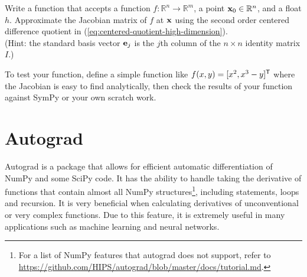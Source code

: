\begin{problem}
Write a function that accepts a function $f:\mathbb{R}^n\rightarrow\mathbb{R}^m$, a point $\mathbf{x}_0 \in \mathbb{R}^n$, and a float $h$.
Approximate the Jacobian matrix of $f$ at $\mathbf{x}$ using the second order centered difference quotient in (\ref{eq:centered-quotient-high-dimension}).
\\(Hint: the standard basis vector $\mathbf{e}_j$ is the $j$th column of the $n\times n$ identity matrix $I$.)

To test your function, define a simple function like $f(x,y) = [x^2, x^3 - y]^{\mathsf T}$ where the Jacobian is easy to find analytically, then check the results of your function against SymPy or your own scratch work.
\label{prob:jac_center}
\end{problem}

\section*{Autograd}%
Autograd is a package that allows for efficient automatic differentiation of NumPy and some SciPy code.
It has the ability to handle taking the derivative of functions that contain almost all NumPy structures\footnote{For a list of NumPy features that autograd does not support, refer to \url{https://github.com/HIPS/autograd/blob/master/docs/tutorial.md}.}, including  statements,  loops and recursion.
It is very beneficial when calculating derivatives of unconventional or very complex functions.
Due to this feature, it is extremely useful in many applications such as machine learning and neural networks.

